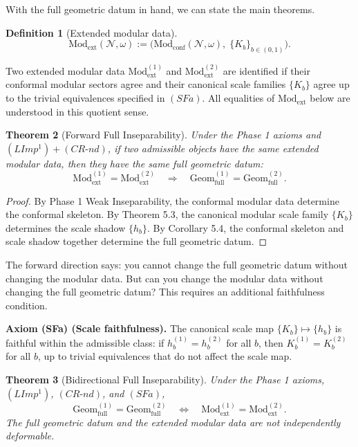 \documentclass[12pt]{article}
\newtheorem{theorem}{Theorem}[section]
\theoremstyle{definition}
\newtheorem{definition}[theorem]{Definition}
\theoremstyle{remark}
\begin{document}
With the full geometric datum in hand, we can state the main theorems.

\begin{definition}[Extended modular data]\label{def:5.5}
\[
\mathrm{Mod}_{\mathrm{ext}}(\mathcal{N},\omega)
:=
\big(\mathrm{Mod}_{\mathrm{conf}}(\mathcal{N},\omega),\; \{K_b\}_{b \in (0,1)}\big).
\]
\end{definition}

Two extended modular data
\(\mathrm{Mod}_{\mathrm{ext}}^{(1)}\) and
\(\mathrm{Mod}_{\mathrm{ext}}^{(2)}\) are identified if their conformal
modular sectors agree and their canonical scale families \(\{K_b\}\)
agree up to the trivial equivalences specified in \((SFa)\). All
equalities of \(\mathrm{Mod}_{\mathrm{ext}}\) below are understood in
this quotient sense.

\begin{theorem}[Forward Full Inseparability]\label{thm:5.6}
Under the Phase 1
axioms and \((LImp^1) + (CR\text{-}nd)\), if two admissible objects have
the same extended modular data, then they have the same full geometric
datum:
\[
\mathrm{Mod}_{\mathrm{ext}}^{(1)} = \mathrm{Mod}_{\mathrm{ext}}^{(2)}
\quad \Longrightarrow \quad
\mathrm{Geom}_{\mathrm{full}}^{(1)} = \mathrm{Geom}_{\mathrm{full}}^{(2)}.
\]
\end{theorem}

\begin{proof}
By Phase 1 Weak Inseparability, the conformal modular
data determine the conformal skeleton. By Theorem 5.3, the canonical
modular scale family \(\{K_b\}\) determines the scale shadow
\(\{h_b\}\). By Corollary 5.4, the conformal skeleton and scale shadow
together determine the full geometric datum.
\end{proof}

The forward direction says: you cannot change the full geometric datum
without changing the modular data. But can you change the modular data
without changing the full geometric datum? This requires an additional
faithfulness
condition.

\textbf{Axiom (SFa) (Scale faithfulness).} The canonical scale map
\(\{K_b\} \mapsto \{h_b\}\) is faithful within the admissible class: if
\(h_b^{(1)} = h_b^{(2)}\) for all \(b\), then \(K_b^{(1)} = K_b^{(2)}\)
for all \(b\), up to trivial equivalences that do not affect the scale
map.

\begin{theorem}[Bidirectional Full Inseparability]\label{thm:5.7}
Under the
Phase 1 axioms, \((LImp^1)\), \((CR\text{-}nd)\), and \((SFa)\), \[
\mathrm{Geom}_{\mathrm{full}}^{(1)} = \mathrm{Geom}_{\mathrm{full}}^{(2)}
\quad \Longleftrightarrow \quad
\mathrm{Mod}_{\mathrm{ext}}^{(1)} = \mathrm{Mod}_{\mathrm{ext}}^{(2)}.
\] The full geometric datum and the extended modular data are not independently
deformable.
\end{theorem}
\end{document}
